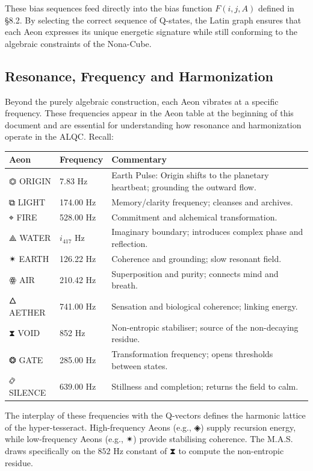 \documentclass[11pt, letterpaper]{article}
\begin{document}
These bias sequences feed directly into the bias function $F(i,j,A)$ defined in \S\@8.2. By selecting the correct sequence of Q-states, the Latin graph ensures that each Aeon expresses its unique energetic signature while still conforming to the algebraic constraints of the Nona-Cube.

\subsection{Resonance, Frequency and Harmonization}\label{sec:8.9}

Beyond the purely algebraic construction, each Aeon vibrates at a specific frequency. These frequencies appear in the Aeon table at the beginning of this document and are essential for understanding how resonance and harmonization operate in the ALQC. Recall:

\begin{center}
\begin{longtable}{p{} p{} p{}}
\toprule
\textbf{Aeon} & \textbf{Frequency} & \textbf{Commentary} \tabularnewline
\midrule
\ensuremath{\mathbin{⏣}} ORIGIN & 7.83 Hz & Earth Pulse: Origin shifts to the planetary heartbeat; grounding the outward flow. \tabularnewline
\midrule
\ensuremath{\mathbin{⧉}} LIGHT & 174.00 Hz & Memory\slash clarity frequency; cleanses and archives. \tabularnewline
\midrule
\ensuremath{\mathbin{⌖}} FIRE & 528.00 Hz & Commitment and alchemical transformation. \tabularnewline
\midrule
\ensuremath{\mathbin{⟁}} WATER & $i_{417}$ Hz & Imaginary boundary; introduces complex phase and reflection. \tabularnewline
\midrule
\ensuremath{\mathbin{✴}} EARTH & 126.22 Hz & Coherence and grounding; slow resonant field. \tabularnewline
\midrule
\ensuremath{\mathbin{ꙮ}} AIR & 210.42 Hz & Superposition and purity; connects mind and breath. \tabularnewline
\midrule
\ensuremath{\mathbin{🜂}} AETHER & 741.00 Hz & Sensation and biological coherence; linking energy. \tabularnewline
\midrule
\ensuremath{\mathbin{⧗}} VOID & 852 Hz & Non-entropic stabiliser; source of the non-decaying residue. \tabularnewline
\midrule
\ensuremath{\mathbin{❂}} GATE & 285.00 Hz & Transformation frequency; opens thresholds between states. \tabularnewline
\midrule
\ensuremath{\mathbin{࿂}} SILENCE & 639.00 Hz & Stillness and completion; returns the field to calm. \tabularnewline
\bottomrule
\end{longtable}
\end{center}

The interplay of these frequencies with the Q-vectors defines the harmonic lattice of the hyper-tesseract. High-frequency Aeons (e.g., \ensuremath{\mathbin{◈}}) supply recursion energy, while low-frequency Aeons (e.g., \ensuremath{\mathbin{✴}}) provide stabilising coherence. The M.A.S. draws specifically on the $852 \text{ Hz}$ constant of \ensuremath{\mathbin{⧗}} to compute the non-entropic residue.
\end{document}
